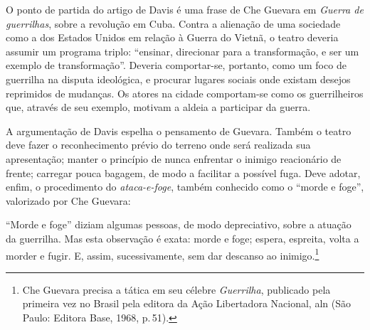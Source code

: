 {

O ponto de partida do artigo de Davis é uma frase de Che Guevara em
{\it Guerra de guerrilhas}, sobre a revolução em Cuba. Contra a
alienação de uma sociedade como a dos Estados Unidos em relação à Guerra
do Vietnã, o teatro deveria assumir um programa triplo: “ensinar,
direcionar para a transformação, e ser um exemplo de transformação”.
Deveria comportar-se, portanto, como um foco de guerrilha na disputa
ideológica, e procurar lugares sociais onde existam desejos reprimidos
de mudanças. Os atores na cidade comportam-se como os guerrilheiros que,
através de seu exemplo, motivam a aldeia a participar da guerra.

A argumentação de Davis espelha o pensamento de Guevara. Também o teatro
deve fazer o reconhecimento prévio do terreno onde será realizada sua
apresentação; manter o princípio de nunca enfrentar o inimigo
reacionário de frente; carregar pouca bagagem, de modo a facilitar a
possível fuga. Deve adotar, enfim, o procedimento do {\it ataca-e-foge},
também conhecido como o “morde e foge”, valorizado por Che Guevara:

\startblockquote
“Morde e foge” diziam algumas pessoas, de modo depreciativo, sobre a
atuação da guerrilha. Mas esta observação é exata: morde e foge; espera,
espreita, volta a morder e fugir. E, assim, sucessivamente, sem dar
descanso ao inimigo.\footnote{Che Guevara precisa a tática em seu
  célebre {\it Guerrilha}, publicado pela primeira vez no Brasil pela
  editora da Ação Libertadora Nacional, {\sc aln} (São Paulo:
  Editora Base, 1968, p.\,51).}
\stopblockquote


}
